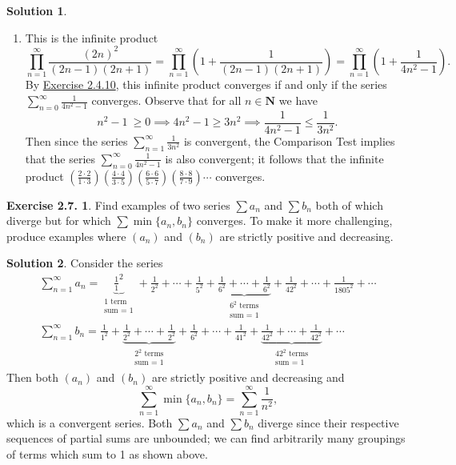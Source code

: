 \documentclass[12pt]{article}
\theoremstyle{definition}
\theoremstyle{exercise}
\newtheorem{exercise}{Exercise 2.7.}
\theoremstyle{solution}
\newtheorem*{solution}{Solution}
\newcommand{\N}{\mathbf{N}}
\begin{document}
\begin{solution}
\begin{enumerate}
        \item This is the infinite product
        \[
            \prod_{n=1}^{\infty} \frac{(2n)^2}{(2n - 1)(2n + 1)} = \prod_{n=1}^{\infty} \left( 1 + \frac{1}{(2n - 1)(2n + 1)} \right) = \prod_{n=1}^{\infty} \left( 1 + \frac{1}{4n^2 - 1} \right).
        \]
        By \href{https://lew98.github.io/Mathematics/UA_Section_2_4_Exercises.pdf}{Exercise 2.4.10}, this infinite product converges if and only if the series \( \sum_{n=0}^{\infty} \tfrac{1}{4n^2 - 1} \) converges. Observe that for all \( n \in \N \) we have
        \[
            n^2 - 1 \ \geq 0 \implies 4 n^2 - 1 \geq 3 n^2 \implies \frac{1}{4 n^2 - 1} \leq \frac{1}{3 n^2}.
        \]
        Then since the series \( \sum_{n=1}^{\infty} \tfrac{1}{3 n^2} \) is convergent, the Comparison Test implies that the series \( \sum_{n=0}^{\infty} \tfrac{1}{4n^2 - 1} \) is also convergent; it follows that the infinite product \( \left( \tfrac{2 \cdot 2}{1 \cdot 3} \right) \left( \tfrac{4 \cdot 4}{3 \cdot 5} \right) \left( \tfrac{6 \cdot 6}{5 \cdot 7} \right) \left( \tfrac{8 \cdot 8}{7 \cdot 9} \right) \cdots \) converges.
    \end{enumerate}
\end{solution}

\begin{exercise}
\label{ex:11}
    Find examples of two series \( \sum a_n \) and \( \sum b_n \) both of which diverge but for which \( \sum \min \{ a_n, b_n \} \) converges. To make it more challenging, produce examples where \( (a_n) \) and \( (b_n) \) are strictly positive and decreasing.
\end{exercise}

\begin{solution}
    Consider the series
    \begin{gather*}
        \sum_{n=1}^{\infty} a_n = \underbrace{\frac{1}{1}^2}_{\substack{1 \text{ term} \\ \text{sum = } 1}} + \frac{1}{2^2} + \cdots + \frac{1}{5^2} +  \underbrace{\frac{1}{6^2} + \cdots + \frac{1}{6^2}}_{\substack{6^2 \text{ terms} \\ \text{sum = } 1}} + \frac{1}{42^2} + \cdots + \frac{1}{1805^2} + \cdots \\[4mm]
        \sum_{n=1}^{\infty} b_n = \frac{1}{1^2} + \underbrace{\frac{1}{2^2} + \cdots + \frac{1}{2^2}}_{\substack{2^2 \text{ terms} \\ \text{sum = } 1}} + \frac{1}{6^2} + \cdots + \frac{1}{41^2} + \underbrace{\frac{1}{42^2} + \cdots + \frac{1}{42^2}}_{\substack{42^2 \text{ terms} \\ \text{sum = } 1}} + \cdots
    \end{gather*}
    Then both \( (a_n) \) and \( (b_n) \) are strictly positive and decreasing and
    \[
        \sum_{n=1}^{\infty} \min \{ a_n, b_n \} = \sum_{n=1}^{\infty} \frac{1}{n^2},
    \]
    which is a convergent series. Both \( \sum a_n \) and \( \sum b_n \) diverge since their respective sequences of partial sums are unbounded; we can find arbitrarily many groupings of terms which sum to 1 as shown above.
\end{solution}
\end{document}
